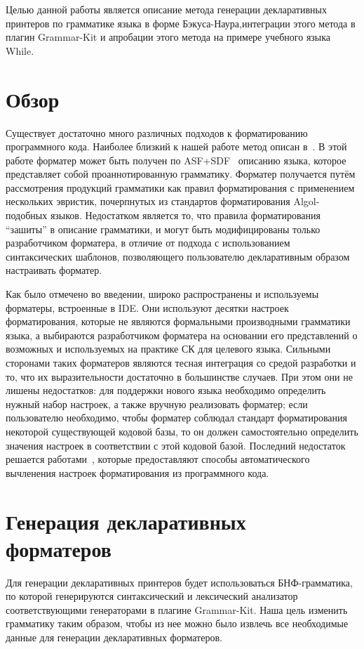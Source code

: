 \documentclass[conference]{IEEEtran}
\begin{document}
Целью данной работы является описание метода генерации декларативных
принтеров по грамматике языка в форме Бэкуса-Наура,интеграции этого метода
в плагин Grammar-Kit и апробации этого метода на примере учебного языка
While.

\section{Обзор}
Существует достаточно много различных подходов к форматированию
программного кода.
Наиболее близкий к нашей работе метод описан в~\cite{Brand-Visser:ACM96}.
В этой работе форматер может быть получен по ASF+SDF~\cite{Klint:ACM93}
описанию языка, которое представляет собой проаннотированную грамматику.
Форматер получается путём 
рассмотрения продукций грамматики как правил форматирования
с применением нескольких эвристик,
почерпнутых из стандартов форматирования Algol-подобных языков.
Недостатком является то, что правила форматирования ``зашиты'' в
описание грамматики, и могут быть модифицированы только разработчиком
форматера,
в отличие от подхода с использованием синтаксических шаблонов,
позволяющего пользователю декларативным образом настраивать форматер.

Как было отмечено во введении, широко распространены и используемы
форматеры, встроенные в IDE.
Они используют десятки настроек форматирования,
которые не являются формальными производными грамматики языка,
а выбираются разработчиком форматера на основании его представлений
о возможных и используемых на практике СК для целевого языка.
Сильными сторонами таких форматеров являются тесная интеграция
со средой разработки и то, что их выразительности достаточно в
большинстве случаев.
При этом они не лишены недостатков:
для поддержки нового языка
необходимо определить нужный набор настроек, а также вручную реализовать
форматер;
если пользователю необходимо, чтобы форматер соблюдал стандарт
форматирования некоторой существующей кодовой базы, то он должен
самостоятельно определить значения настроек
в соответствии с этой кодовой базой.
Последний недостаток решается
работами~\cite{Corbo-al:ICSM07,JB-Gen}, которые предоставляют
способы автоматического вычленения настроек форматирования из программного
кода.

\section{Генерация декларативных форматеров}
Для генерации декларативных принтеров будет использоваться БНФ-грамматика, по которой генерируются синтаксический и лексический анализатор соответствующими генераторами в плагине Grammar-Kit.
Наша цель изменить грамматику таким образом, чтобы из нее можно было извлечь все необходимые данные для генерации декларативных форматеров.
\end{document}
